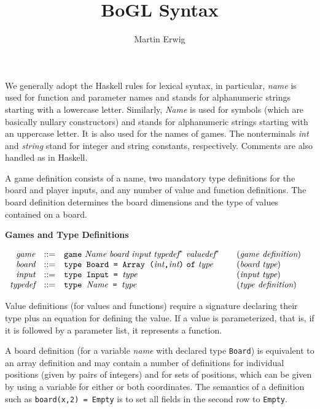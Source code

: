 \documentclass[11pt]{article}
\makeatletter
\newcommand{\prodName}[1]{&(\emph{#1})\\}
\newcommand{\nt}[1]{\textit{#1}}
\newcommand{\prog}[1]{\texttt{#1}}
\newcommand{\IS}{&::=&}
\newcommand{\syntax}[2]{
  \needspace{3\baselineskip}
  \bigskip\par\noindent\textbf{#1}\par\smallskip%
  $\begin{array}{rcl@{\qquad}l}#2\end{array}$%
  \par\bigskip\noindent\ignorespaces
}
\newcommand{\lp}{\prog{(}}
\newcommand{\rp}{\prog{)}}
\newcommand{\paren}[1]{\lp#1\rp}
\newcommand{\pair}[2]{\paren{#1\prog{,}#2}}
\makeatother
\begin{document}
\title{BoGL Syntax}
\author{Martin Erwig}
\maketitle

\noindent
%
We generally adopt the Haskell rules for lexical syntax, in particular,
\nt{name} is used for function and parameter names and stands for alphanumeric
strings starting with a lowercase letter.
%
Similarly, \nt{Name} is used for symbols (which are basically nullary
constructors) and stands for alphanumeric strings starting with an uppercase
letter. It is also used for the names of games.
%
The nonterminals \nt{int} and \nt{string} stand for integer and string
constants, respectively.
%
Comments are also handled as in Haskell.

A game definition consists of a name, two mandatory type definitions for the board and player inputs, and any number of value and function definitions.
%
The board definition determines the board dimensions and the type of values
contained on a board.

\syntax{Games and Type Definitions}{
\nt{game}    \IS  \prog{game}\ \nt{Name}\ \nt{board}\ \nt{input}
                  \ \nt{typedef}^*\ \nt{valuedef}^*
                                                     \prodName{game definition}
\nt{board}   \IS  \prog{type Board = Array }\pair{\nt{int}}{\nt{int}}\
                  \prog{of}\ \nt{type}                \prodName{board type}
\nt{input}   \IS  \prog{type Input = }\nt{type}      \prodName{input type}
\nt{typedef} \IS  \prog{type }\nt{Name}\prog{ = }\nt{type}      \prodName{type definition}
}
%
Value definitions (for values and functions) require a signature declaring
their type plus an equation for defining the value. If a value is
parameterized, that is, if it is followed by a parameter list, it represents a
function.

A board definition (for a variable \nt{name} with declared type \prog{Board})
is equivalent to an array definition and may contain a number of definitions
for individual positions (given by pairs of integers) and for sets of
positions, which can be given by using a variable for either or both
coordinates. The semantics of a definition such as \prog{board(x,2) = Empty} is
to set all fields in the second row to \prog{Empty}.
\end{document}
